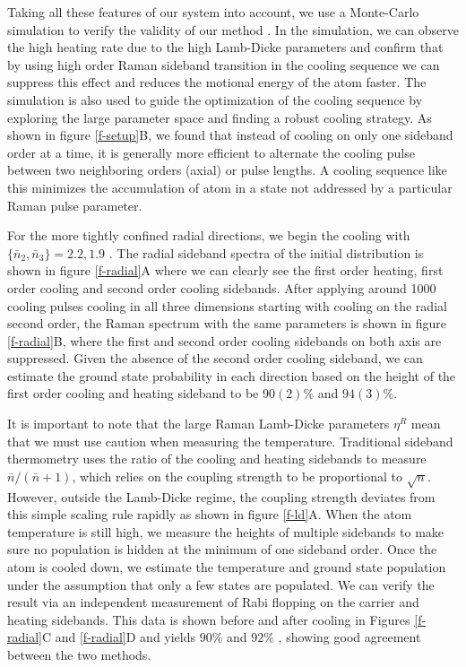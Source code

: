 \documentclass[aps,prl,twocolumn,groupedaddress]{revtex4-1}
\begin{document}
Taking all these features of our system into account, we use a Monte-Carlo simulation to verify
the validity of our method .
In the simulation, we can observe the high heating rate due to the high Lamb-Dicke parameters
and confirm that by using high order Raman sideband transition in the cooling sequence we can
suppress this effect and reduces the motional energy of the atom faster.
The simulation is also used to guide the optimization of the cooling sequence by exploring the
large parameter space and finding a robust cooling strategy. As shown in figure \ref{f-setup}B,
we found that instead of cooling on only one sideband order at a time, it is generally more
efficient to alternate the cooling pulse between two neighboring orders (axial) or pulse lengths.
A cooling sequence like this minimizes the accumulation of atom in a state not addressed by a
particular Raman pulse parameter.

For the more tightly confined radial directions,
we begin the cooling with $\{\bar n_2, \bar n_3\}=2.2, 1.9$ .
The radial sideband spectra of the initial distribution is shown in figure \ref{f-radial}A
where we can clearly see the first order heating, first order cooling and
second order cooling sidebands.
After applying around 1000 cooling pulses cooling in all three dimensions
starting with cooling on the radial second order,
the Raman spectrum with the same parameters is shown in figure \ref{f-radial}B,
where the first and second order cooling sidebands on both axis are suppressed.
Given the absence of the second order cooling sideband,
we can estimate the ground state probability in each direction based on the height of
the first order cooling and heating sideband to be $90(2)\%$ and $94(3)\%$.

It is important to note that the large Raman Lamb-Dicke parameters $\eta^R$ mean that we must use caution when measuring the temperature.
Traditional sideband thermometry uses
the ratio of the cooling and heating sidebands to measure $\bar n / (\bar n + 1)$, which relies
on the coupling strength to be proportional to $\sqrt{n}$. However, outside the
Lamb-Dicke regime, the coupling strength deviates from this simple scaling rule rapidly as
shown in figure \ref{f-ld}A.
When the atom temperature is still high,
we measure the heights of multiple sidebands to make sure no population is hidden at the
minimum of one sideband order. Once the atom is cooled down, we estimate the temperature
and ground state population under the assumption that only a few states are populated.
We can verify the result via an independent measurement of Rabi flopping on the carrier and heating
sidebands. This data is shown before and after cooling in Figures
\ref{f-radial}C and \ref{f-radial}D
and yields $90\%$ and $92\%$ ,
showing good agreement between the two methods.
\end{document}
